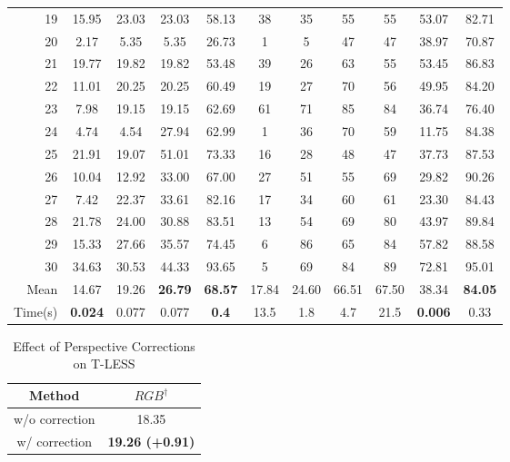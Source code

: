 {\begin{table}[t]
\begin{adjustbox}{max width=\textwidth}
\begin{tabular}{r|ccc|ccccc|cc}
			19 &       15.95 & 		23.03 &  23.03 &   58.13  & 38&     35 &  55 &  55 & 53.07 &     82.71 \\
			20 &       2.17 &  		5.35 &   5.35 &    26.73  & 1&  5 &  47 &   47 & 38.97 &     70.87 \\
			21 &       19.77 & 		19.82 &  19.82 &   53.48  & 39&     26 &  63 &  55 & 53.45 &     86.83 \\
			22 &       11.01 & 	    20.25 &  20.25 &   60.49  & 19&     27 & 70 &  56 & 49.95 &     84.20 \\
			23 &       7.98 &  		19.15 &  19.15 &   62.69  & 61&     71 &  85 &  84 & 36.74 &     76.40 \\
			24 &       4.74 &  		4.54 &   27.94 &   62.99  & 1&  36 &  70 &   59 & 11.75 &     84.38 \\
			25 &      21.91 &  		19.07 &  51.01 &   73.33  & 16&     28 &  48 &   47 & 37.73 &     87.53 \\
			26 &       10.04 & 		12.92 &  33.00 &   67.00  & 27&     51 &  55 &  69 & 29.82 &     90.26 \\
			27 &       7.42 &  		22.37 &  33.61 &   82.16  & 17&     34 &  60 &   61 & 23.30 &     84.43 \\
			28 &      21.78 &  		24.00 &  30.88 &   83.51  & 13&     54 &  69 &   80 & 43.97 &     89.84 \\
			29 &      15.33 &  		27.66 &  35.57 &   74.45  & 6&  86 &  65 &   84 & 57.82 &     88.58 \\
			30 &      34.63 &  		30.53 &  44.33 &   93.65  & 5&  69 &  84 &   89 & 72.81 &     95.01 \\
			\midrule
			Mean &14.67 &19.26 & \textbf{26.79} &\textbf{68.57}& 17.84 &24.60& 66.51 &  67.50 &38.34 &\textbf{84.05}\\
			\midrule
			Time(s) & \textbf{0.024} &  0.077 &  0.077 &\textbf{0.4}& 13.5 & 1.8& 4.7 &  21.5 & \textbf{0.006} &0.33
		\end{tabular}
	\end{adjustbox}
	
	\label{tab:tless}
\end{table}

	{\setlength{\tabcolsep}{0.4em}
	\begin{table}
		\centering
		\small
		\captionsetup{width=\textwidth}
		\caption{Effect of Perspective Corrections on T-LESS}
		\begin{tabular}{c|c}
			\toprule
			Method & $RGB^\dag$  \\
			\midrule
			w/o correction & 18.35 \\
			w/ correction & \textbf{19.26 (+0.91)} 
		\end{tabular}
		\label{tab:persp}
		

\end{table}}}
